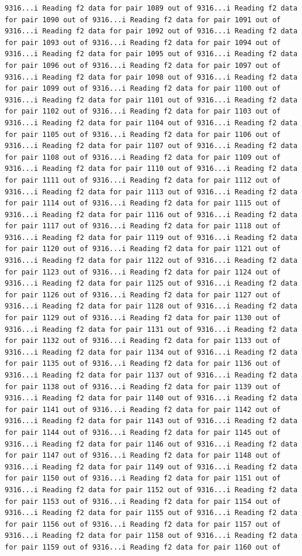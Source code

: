 \documentclass[
]{article}
\begin{document}
\begin{verbatim}
9316...i Reading f2 data for pair 1089 out of 9316...i Reading f2 data for pair 1090 out of 9316...i Reading f2 data for pair 1091 out of 9316...i Reading f2 data for pair 1092 out of 9316...i Reading f2 data for pair 1093 out of 9316...i Reading f2 data for pair 1094 out of 9316...i Reading f2 data for pair 1095 out of 9316...i Reading f2 data for pair 1096 out of 9316...i Reading f2 data for pair 1097 out of 9316...i Reading f2 data for pair 1098 out of 9316...i Reading f2 data for pair 1099 out of 9316...i Reading f2 data for pair 1100 out of 9316...i Reading f2 data for pair 1101 out of 9316...i Reading f2 data for pair 1102 out of 9316...i Reading f2 data for pair 1103 out of 9316...i Reading f2 data for pair 1104 out of 9316...i Reading f2 data for pair 1105 out of 9316...i Reading f2 data for pair 1106 out of 9316...i Reading f2 data for pair 1107 out of 9316...i Reading f2 data for pair 1108 out of 9316...i Reading f2 data for pair 1109 out of 9316...i Reading f2 data for pair 1110 out of 9316...i Reading f2 data for pair 1111 out of 9316...i Reading f2 data for pair 1112 out of 9316...i Reading f2 data for pair 1113 out of 9316...i Reading f2 data for pair 1114 out of 9316...i Reading f2 data for pair 1115 out of 9316...i Reading f2 data for pair 1116 out of 9316...i Reading f2 data for pair 1117 out of 9316...i Reading f2 data for pair 1118 out of 9316...i Reading f2 data for pair 1119 out of 9316...i Reading f2 data for pair 1120 out of 9316...i Reading f2 data for pair 1121 out of 9316...i Reading f2 data for pair 1122 out of 9316...i Reading f2 data for pair 1123 out of 9316...i Reading f2 data for pair 1124 out of 9316...i Reading f2 data for pair 1125 out of 9316...i Reading f2 data for pair 1126 out of 9316...i Reading f2 data for pair 1127 out of 9316...i Reading f2 data for pair 1128 out of 9316...i Reading f2 data for pair 1129 out of 9316...i Reading f2 data for pair 1130 out of 9316...i Reading f2 data for pair 1131 out of 9316...i Reading f2 data for pair 1132 out of 9316...i Reading f2 data for pair 1133 out of 9316...i Reading f2 data for pair 1134 out of 9316...i Reading f2 data for pair 1135 out of 9316...i Reading f2 data for pair 1136 out of 9316...i Reading f2 data for pair 1137 out of 9316...i Reading f2 data for pair 1138 out of 9316...i Reading f2 data for pair 1139 out of 9316...i Reading f2 data for pair 1140 out of 9316...i Reading f2 data for pair 1141 out of 9316...i Reading f2 data for pair 1142 out of 9316...i Reading f2 data for pair 1143 out of 9316...i Reading f2 data for pair 1144 out of 9316...i Reading f2 data for pair 1145 out of 9316...i Reading f2 data for pair 1146 out of 9316...i Reading f2 data for pair 1147 out of 9316...i Reading f2 data for pair 1148 out of 9316...i Reading f2 data for pair 1149 out of 9316...i Reading f2 data for pair 1150 out of 9316...i Reading f2 data for pair 1151 out of 9316...i Reading f2 data for pair 1152 out of 9316...i Reading f2 data for pair 1153 out of 9316...i Reading f2 data for pair 1154 out of 9316...i Reading f2 data for pair 1155 out of 9316...i Reading f2 data for pair 1156 out of 9316...i Reading f2 data for pair 1157 out of 9316...i Reading f2 data for pair 1158 out of 9316...i Reading f2 data for pair 1159 out of 9316...i Reading f2 data for pair 1160 out of 
\end{verbatim}
\end{document}
